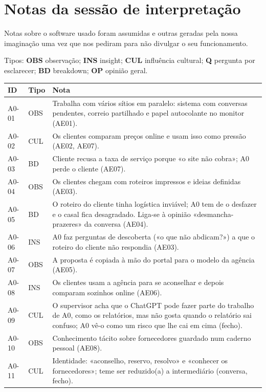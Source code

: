 \documentclass[11pt,a4paper]{article}
\begin{document}
\section{Notas da sessão de interpretação}
\begin{aviso}
  Notas sobre o software usado foram assumidas e outras geradas pela nossa imaginação
  uma vez que nos pediram para não divulgar o seu funcionamento.
\end{aviso}
Tipos: \textbf{OBS} observação; \textbf{INS} insight; \textbf{CUL} influência cultural; \textbf{Q} pergunta por esclarecer; \textbf{BD} breakdown; \textbf{OP} opinião geral.

{\small
\begin{longtable}{@{}p{1.5cm}p{1.1cm}p{11.8cm}@{}}
\toprule
\textbf{ID} & \textbf{Tipo} & \textbf{Nota} \\ \midrule \endhead
A0-01 & OBS & Trabalha com vários sítios em paralelo: sistema com conversas pendentes, correio partilhado e papel autocolante no monitor (AE01). \\
A0-02 & CUL & Os clientes comparam preços online e usam isso como pressão (AE02, AE07). \\
A0-03 & BD & Cliente recusa a taxa de serviço porque «o site não cobra»; A0 perde o cliente (AE07). \\
A0-04 & OBS & Os clientes chegam com roteiros impressos e ideias definidas (AE03). \\
A0-05 & BD & O roteiro do cliente tinha logística inviável; A0 tem de o desfazer e o casal fica desagradado. Liga-se à opinião «desmancha-prazeres» da conversa (AE04). \\
A0-06 & INS & A0 faz perguntas de descoberta («o que não abdicam?») a que o roteiro do cliente não respondia (AE03). \\
A0-07 & OBS & A proposta é copiada à mão do portal para o modelo da agência (AE05). \\
A0-08 & INS & Os clientes usam a agência para se aconselhar e depois comparam sozinhos online (AE06). \\
A0-09 & CUL & O supervisor acha que o ChatGPT pode fazer parte do trabalho de A0, como os relatórios, mas não gosta quando o relatório sai confuso; A0 vê-o como um risco que lhe cai em cima (fecho). \\
A0-10 & OBS & Conhecimento tácito sobre fornecedores guardado num caderno pessoal (AE08). \\
A0-11 & CUL & Identidade: «aconselho, reservo, resolvo» e «conhecer os fornecedores»; teme ser reduzido(a) a intermediário (conversa, fecho). \\

\end{longtable}}
\end{document}
